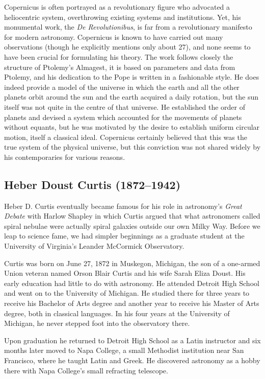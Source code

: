 Copernicus is often portrayed as a revolutionary figure who advocated a heliocentric system, overthrowing existing systems and institutions. Yet, his monumental work, the \textit{De Revolutionibus}, is far from a revolutionary manifesto for modern astronomy. Copernicus is known to have carried out many observations (though he explicitly mentions only about 27), and none seems to have been crucial for formulating his theory. The work follows closely the structure of Ptolemy's Almagest, it is based on parameters and data from Ptolemy, and his dedication to the Pope is written in a fashionable style. He does indeed provide a model of the universe in which the earth and all the other planets orbit around the sun and the earth acquired a daily rotation, but the sun itself was not quite in the centre of that universe. He established the order of planets and devised a system which accounted for the movements of planets without equants, but he was motivated by the desire to establish uniform circular motion, itself a classical ideal. Copernicus certainly believed that this was the true system of the physical universe, but this conviction was not shared widely by his contemporaries for various reasons.

\subsection[Heber \scshape{Curtis}]{Heber Doust Curtis (1872--1942)}\label{bio:curtis}
Heber D. Curtis eventually became famous for his role in astronomy's \textit{Great Debate} with Harlow Shapley in which Curtis argued that what astronomers called spiral nebulae were actually spiral galaxies outside our own Milky Way. Before we leap to science fame, we had simpler beginnings as a graduate student at the University of Virginia's Leander McCormick Observatory.

Curtis was born on June 27, 1872 in Muskegon, Michigan, the son of a one-armed Union veteran named Orson Blair Curtis and his wife Sarah Eliza Doust. His early education had little to do with astronomy. He attended Detroit High School and went on to the University of Michigan. He studied there for three years to receive his Bachelor of Arts degree and another year to receive his Master of Arts degree, both in classical languages. In his four years at the University of Michigan, he never stepped foot into the observatory there.

Upon graduation he returned to Detroit High School as a Latin instructor and six months later moved to Napa College, a small Methodist institution near San Francisco, where he taught Latin and Greek. He discovered astronomy as a hobby there with Napa College's small refracting telescope.

